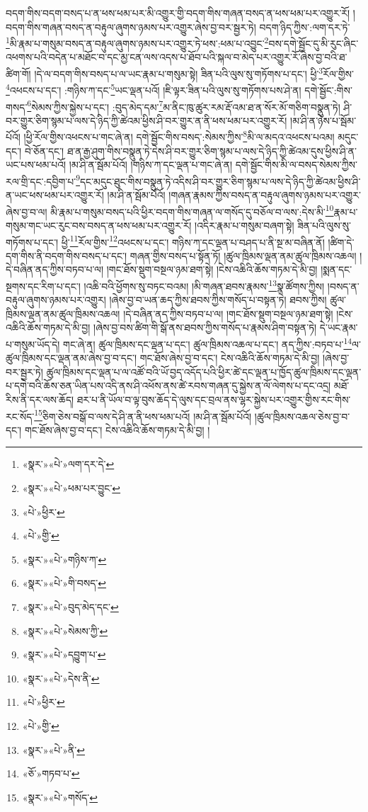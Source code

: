 བདག་གིས་བདག་བསད་པ་ན་ཕས་ཕམ་པར་མི་འགྱུར་གྱི་བདག་གིས་གཞན་བསད་ན་ཕས་ཕམ་པར་འགྱུར་རོ། །བདག་གིས་གཞན་བསད་ན་བརྟུལ་ཞུགས་ཉམས་པར་འགྱུར་ཞེས་བྱ་བར་སྦྱར་ཏེ། བདག་ཉིད་ཀྱིས་:ལག་དར་ཏེ་\footnote{«སྣར་»«པེ་»ལག་དར་དེ་}མི་རྣམ་པ་གསུམ་བསད་ན་བརྟུལ་ཞུགས་ཉམས་པར་འགྱུར་ཏེ་ཕས་:ཕམ་པ་འབྱུང་\footnote{«སྣར་»«པེ་»ཕམ་པར་བྱུང་}བས་དགེ་སྦྱོང་དུ་མི་རུང་ཞིང་འཕགས་པའི་བདེན་པ་མཐོང་བ་དང་མྱ་ངན་ལས་འདས་པ་ཐོབ་པའི་སྐལ་བ་མེད་པར་འགྱུར་རོ་ཞེས་བྱ་བའི་ཐ་ཚིག་གོ། །དེ་ལ་བདག་གིས་བསད་པ་ལ་ཡང་རྣམ་པ་གསུམ་སྟེ། ཟིན་པའི་ལུས་སུ་གཏོགས་པ་དང་། ཕྱི་\footnote{«པེ་»ཕྱིར་}རོལ་གྱིས་\footnote{«པེ་»གྱི་}འཕངས་པ་དང་། :གཉིས་ཀ་དང་\footnote{«སྣར་»«པེ་»གཉིས་ཀ་}ཡང་ལྡན་པའོ། །ཇི་ལྟར་ཟིན་པའི་ལུས་སུ་གཏོགས་པས་ཤེ་ན། དགེ་སྦྱོང་:གིས་གསད་\footnote{«སྣར་»«པེ་»གི་བསད་}སེམས་ཀྱིས་སྐྱེས་པ་དང་། :བུད་མེད་དམ་\footnote{«སྣར་»«པེ་»བུད་མེད་དང་}མ་ནིང་ཁུ་ཚུར་རམ་རྡོ་འམ་ཐ་ན་སོར་མོ་གཅིག་བསྣུན་ཏེ། ཤི་བར་གྱུར་ཅིག་སྙམ་པ་ལས་དེ་ཉིད་ཀྱི་ཚེའམ་ཕྱིས་ཤི་བར་གྱུར་ན་ནི་ཕས་ཕམ་པར་འགྱུར་རོ། །མ་ཤི་ན་ཉེས་པ་སྦོམ་པོའོ། །ཕྱི་རོལ་གྱིས་འཕངས་པ་གང་ཞེ་ན། དགེ་སྦྱོང་གིས་བསད་:སེམས་ཀྱིས་\footnote{«སྣར་»«པེ་»སེམས་ཀྱི་}མི་ལ་མདའ་འཕངས་པའམ། མདུང་དང་། བེ་ཅོན་དང་། ཐ་ན་རྒྱ་ཤུག་གིས་བསྣུན་ཏེ་དེས་ཤི་བར་གྱུར་ཅིག་སྙམ་པ་ལས་དེ་ཉིད་ཀྱི་ཚེའམ་དུས་ཕྱིས་ཤི་ན་ཡང་པས་ཕམ་པའོ། །མ་ཤི་ན་སྦོམ་པོའོ། །གཉིས་ཀ་དང་ལྡན་པ་གང་ཞེ་ན། དགེ་སྦྱོང་གིས་མི་ལ་བསད་སེམས་ཀྱིས་རལ་གྲི་དང་:དབྱིག་པ་\footnote{«སྣར་»«པེ་»དབྱུག་པ་}དང་མདུང་ཐུང་གིས་བསྣུན་ཏེ་འདིས་ཤི་བར་གྱུར་ཅིག་སྙམ་པ་ལས་དེ་ཉིད་ཀྱི་ཚེའམ་ཕྱིས་ཤི་ན་ཡང་ཕས་ཕམ་པར་འགྱུར་རོ། །མ་ཤི་ན་སྦོམ་པོའོ། །གཞན་རྣམས་ཀྱིས་བསད་ན་བརྟུལ་ཞུགས་ཉམས་པར་འགྱུར་ཞེས་བྱ་བ་ལ། མི་རྣམ་པ་གསུམ་བསད་པའི་ཕྱིར་བདག་གིས་གཞན་ལ་གསོད་དུ་བཅོལ་བ་ལས་:དེས་མི་\footnote{«སྣར་»«པེ་»དེས་ནི་}རྣམ་པ་གསུམ་གང་ཡང་རུང་བས་བསད་ན་ཕས་ཕམ་པར་འགྱུར་རོ། །འདིར་རྣམ་པ་གསུམ་བཞག་སྟེ། ཟིན་པའི་ལུས་སུ་གཏོགས་པ་དང་། ཕྱི་\footnote{«པེ་»ཕྱིར་}རོལ་གྱིས་\footnote{«པེ་»གྱི་}འཕངས་པ་དང་། གཉིས་ཀ་དང་ལྡན་པ་བཤད་པ་ནི་སྔ་མ་བཞིན་ནོ། །ཚིག་དེ་དག་གིས་ནི་བདག་གིས་བསད་པ་དང་། གཞན་གྱིས་བསད་པ་སྟོན་ཏོ། །ཚུལ་ཁྲིམས་ལྡན་ནམ་ཚུལ་ཁྲིམས་འཆལ། །དེ་བཞིན་ནད་ཀྱིས་བཏབ་པ་ལ། །གང་ཐོས་སྡུག་བསྔལ་ཉམ་ཐག་སྟེ། །ངེས་འཆིའི་ཆོས་གཏམ་དེ་མི་བྱ། །སྨན་དང་སྔགས་དང་རིག་པ་དང་། །འཆི་བའི་ཕྱོགས་སུ་བཏང་བའམ། །མི་གཞན་ཐབས་རྣམས་\footnote{«སྣར་»«པེ་»ནི་}སྣ་ཚོགས་ཀྱིས། །བསད་ན་བརྟུལ་ཞུགས་ཉམས་པར་འགྱུར། །ཞེས་བྱ་བ་ཡན་ཆད་ཀྱིས་ཐབས་ཀྱིས་གསོད་པ་བསྟན་ཏེ། ཐབས་ཀྱིས། ཚུལ་ཁྲིམས་ལྡན་ནམ་ཚུལ་ཁྲིམས་འཆལ། །དེ་བཞིན་ནད་ཀྱིས་བཏབ་པ་ལ། །གང་ཐོས་སྡུག་བསྔལ་ཉམ་ཐག་སྟེ། །ངེས་འཆིའི་ཆོས་གཏམ་དེ་མི་བྱ། །ཞེས་བྱ་བས་ཚིག་གི་སྒོ་ནས་ཐབས་ཀྱིས་གསོད་པ་རྣམས་ཤིག་བསྟན་ཏེ། དེ་ཡང་རྣམ་པ་གསུམ་ཡོད་དེ། གང་ཞེ་ན། ཚུལ་ཁྲིམས་དང་ལྡན་པ་དང་། ཚུལ་ཁྲིམས་འཆལ་པ་དང་། ནད་ཀྱིས་:བཏབ་པ་\footnote{«ཅོ་»གཏབ་པ་}ལ་ཚུལ་ཁྲིམས་དང་ལྡན་ནམ་ཞེས་བྱ་བ་དང་། གང་ཐོས་ཞེས་བྱ་བ་དང་། ངེས་འཆིའི་ཆོས་གཏམ་དེ་མི་བྱ། །ཞེས་བྱ་བར་སྦྱར་ཏེ། ཚུལ་ཁྲིམས་དང་ལྡན་པ་ལ་འཚོ་བའི་ཡོ་བྱད་འདོད་པའི་ཕྱིར་ཚེ་དང་ལྡན་པ་ཁྱོད་ཚུལ་ཁྲིམས་དང་ལྡན་པ་དགེ་བའི་ཆོས་ཅན་ཡིན་པས་འདི་ནས་ཤི་འཕོས་ནས་ཚེ་རབས་གཞན་དུ་སྐྱེས་ན་ལོ་ལེགས་པ་དང་འདྲ། མཐོ་རིས་ནི་དར་ལས་ཆོད། ཐར་པ་ནི་ཡོལ་བ་ལྟ་བུས་ཆོད་དེ་ལུས་དང་བྲལ་ནས་ལྷར་སྐྱེས་པར་འགྱུར་གྱིས་རང་གིས་རང་སོད་\footnote{«སྣར་»«པེ་»གསོད་}ཅིག་ཅེས་བསྒོ་བ་ལས་དེ་ཤི་ན་ནི་ཕས་ཕམ་པའོ། །མ་ཤི་ན་སྦོམ་པོའོ། །ཚུལ་ཁྲིམས་འཆལ་ཅེས་བྱ་བ་དང་། གང་ཐོས་ཞེས་བྱ་བ་དང་། ངེས་འཆིའི་ཆོས་གཏམ་དེ་མི་བྱ། །
